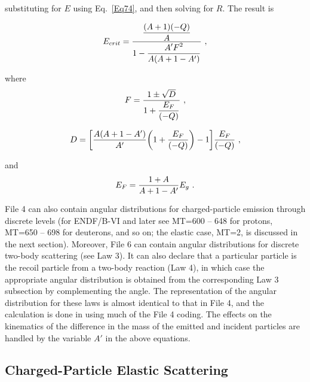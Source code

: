 \noindent
substituting for $E$ using Eq.~\ref{Eq74}, and then solving
for $R$.  The result is

  \begin{equation}
    E_{crit}={\displaystyle{ {{(A+1)(-Q)}\over{A}} }\over
    \displaystyle{1- {\displaystyle{A'F^2}\over{A(A+1-A')}} }}\,\,,
  \label{Eq79}
  \end{equation}
\vspace{0.5 pt}

\noindent
where
  \begin{equation}
    F={{1\pm\sqrt{D}}\over{1+ \displaystyle{{E_F}\over{(-Q)}} }}\,\,,
  \end{equation}
\vspace{0.5 pt}

  \begin{equation}
    D=\biggl[ \frac{A(A+1-A')}{A'}
       \biggl( 1+{{E_F}\over{(-Q)}} \biggr) -1 \biggr]
    {{E_F}\over{(-Q)}}\,\,,
  \end{equation}
\vspace{0.5 pt}

\noindent
and
  \begin{equation}
    E_F={{1+A}\over {A+1-A'}} E_g\,\,.
  \label{Eq82}
  \end{equation}

File 4 can also contain angular distributions for charged-particle
emission through discrete levels (for ENDF/B-VI and later see
MT=600 -- 648 for protons,
MT=650 -- 698 for deuterons, and so on; the elastic case, MT=2, is
discussed in the next section).  Moreover, File 6 can contain angular
distributions for discrete two-body scattering (see Law 3).  It can
also declare that a particular particle is the recoil particle
from a two-body reaction (Law 4), in which case the appropriate
angular distribution is obtained from the corresponding Law 3
subsection by complementing the angle.  The representation of the
angular distribution for these laws is almost identical to that
in File 4, and the calculation is done in
 using much
of the File 4 coding.  The effects on the kinematics of the difference
in the mass of the emitted and incident particles are handled by the
variable $A'$ in the above equations.

\subsection{Charged-Particle Elastic Scattering}
\label{ssGROUPR_CPEl}

